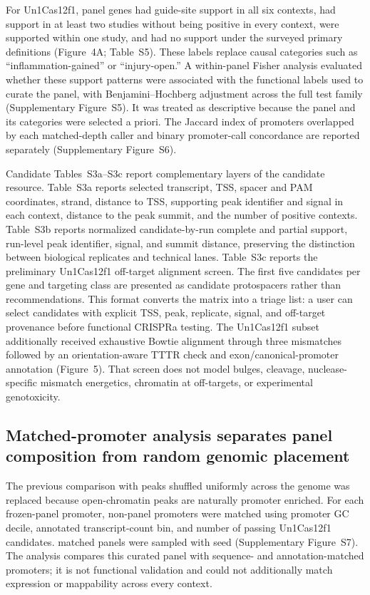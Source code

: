 \documentclass[11pt]{article}
\begin{document}
For Un1Cas12f1, \AllSixPatternN{} panel genes had guide-site support in all six contexts, \MultiStudyPatternN{} had support in at least two studies without being positive in every context, \SingleStudyPatternN{} were supported within one study, and \NoContextPatternN{} had no support under the surveyed primary definitions (Figure~4A; Table~S5). These labels replace causal categories such as ``inflammation-gained'' or ``injury-open.'' A within-panel Fisher analysis evaluated whether these support patterns were associated with the functional labels used to curate the panel, with Benjamini--Hochberg adjustment across the full test family (Supplementary Figure~S5). It was treated as descriptive because the panel and its categories were selected a priori. The Jaccard index of promoters overlapped by each matched-depth caller and binary promoter-call concordance are reported separately (Supplementary Figure~S6).

Candidate Tables~S3a--S3c report complementary layers of the candidate resource. Table~S3a reports selected transcript, TSS, spacer and PAM coordinates, strand, distance to TSS, supporting peak identifier and signal in each context, distance to the peak summit, and the number of positive contexts. Table~S3b reports normalized candidate-by-run complete and partial support, run-level peak identifier, signal, and summit distance, preserving the distinction between biological replicates and technical lanes. Table~S3c reports the preliminary Un1Cas12f1 off-target alignment screen. The first five candidates per gene and targeting class are presented as candidate protospacers rather than recommendations. This format converts the matrix into a triage list: a user can select candidates with explicit TSS, peak, replicate, signal, and off-target provenance before functional CRISPRa testing. The Un1Cas12f1 subset additionally received exhaustive Bowtie alignment through three mismatches followed by an orientation-aware TTTR check and exon/canonical-promoter annotation (Figure~5). That screen does not model bulges, cleavage, nuclease-specific mismatch energetics, chromatin at off-targets, or experimental genotoxicity.

\subsection{Matched-promoter analysis separates panel composition from random genomic placement}

The previous comparison with peaks shuffled uniformly across the genome was replaced because open-chromatin peaks are naturally promoter enriched. For each frozen-panel promoter, non-panel promoters were matched using promoter GC decile, annotated transcript-count bin, and number of passing Un1Cas12f1 candidates. \NPermutationResamplesFormatted{} matched panels were sampled with seed \PermutationSeed{} (Supplementary Figure~S7). The analysis compares this curated panel with sequence- and annotation-matched promoters; it is not functional validation and could not additionally match expression or mappability across every context.
\end{document}
